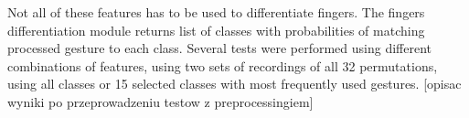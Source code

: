 Not all of these features has to be used to differentiate fingers.
The fingers differentiation module returns list of classes with probabilities of matching processed gesture to each class. 
Several tests were performed using different combinations of features, using two sets of recordings of all 32 permutations, using all classes or 15 selected classes with most frequently used gestures. {\color{red}[opisac wyniki po przeprowadzeniu testow z preprocessingiem]}